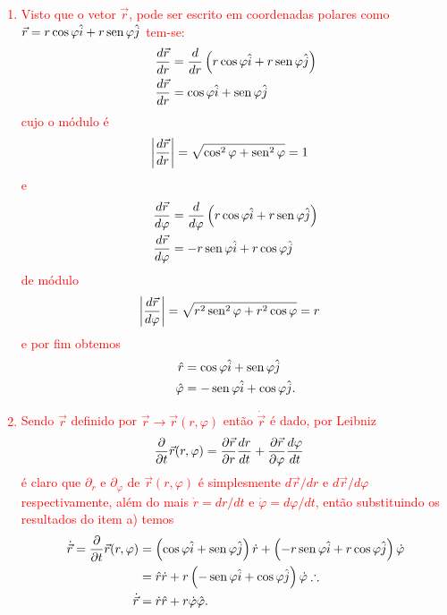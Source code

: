 \textcolor{red}{
	\begin{sol}
		\begin{enumerate}[label=\alph *)]
			\item Visto que o vetor $\vec{r}$, pode ser escrito em coordenadas polares como $\vec{r}=r\cos\varphi\hat{i}+r\operatorname{sen}\varphi \hat{j}$ tem-se:
			\begin{align}
				\frac{d\vec{r}}{dr}&=\frac{d}{dr}\left(r\cos\varphi\hat{i}+r\operatorname{sen}\varphi\hat{j}\right)\nonumber\\ 
				\frac{d\vec{r}}{dr}&=\cos\varphi\hat{i}+\operatorname{sen}\varphi\hat{j}
			\end{align}
	cujo o módulo é \cite{2004}
			\begin{align}
				\left\vert\frac{d\vec{r}}{dr}\right\vert&=\sqrt{\cos^2\varphi+\operatorname{sen}^2\varphi}=1
			\end{align}
	e
			\begin{align}
				\frac{d\vec{r}}{d\varphi}&=\frac{d}{d\varphi}\left(r\cos\varphi\hat{i}+r\operatorname{sen}\varphi\hat{j}\right)\nonumber\\
				\frac{d\vec{r}}{d\varphi}&=-r\operatorname{sen}\varphi\hat{i}+r\cos\varphi\hat{j}
			\end{align}
	de módulo
			\begin{align}
				\left\vert\frac{d\vec{r}}{d\varphi}\right\vert&=\sqrt{r^{2}\operatorname{sen}^2\varphi+r^{2}\cos\varphi}=r
			\end{align}
	e por fim obtemos
			\begin{align}
				\hat{r}&=\cos\varphi\hat{i}+\operatorname{sen}\varphi\hat{j}\\
				\hat{\varphi}&=-\operatorname{sen}\varphi\hat{i}+\cos\varphi\hat{j}.
			\end{align}
			\item Sendo $\vec{r}$ definido por $\vec{r}\rightarrow\vec{r}(r,\varphi)$ então $\dot{\vec{r}}$ é dado, por Leibniz
			\begin{align}
				\frac{\partial {}}{\partial {t}}\vec{r}(r,\varphi)&=\frac{\partial {\vec{r}}}{\partial {r}}\frac{dr}{dt}+\frac{\partial {\vec{r}}}{\partial {\varphi}}\frac{d\varphi}{dt}
			\end{align}
	é claro que $\partial_{r}$ e $\partial_\varphi$ de $\vec{r}(r,\varphi)$ é simplesmente $d\vec{r}/dr$ e $d\vec{r}/d\varphi$ respectivamente, além do mais $\dot{r}=dr/dt$ e $\dot{\varphi}=d\varphi/dt$, então substituindo os resultados do item a) temos
			\begin{align}
				\dot{\vec{r}}=\frac{\partial {}}{\partial {t}}\vec{r}(r,\varphi)&=\left(\cos\varphi\hat{i}+\operatorname{sen}\varphi\hat{j}\right)\dot{r}+\left(-r\operatorname{sen}\varphi\hat{i}+r\cos\varphi\hat{j}\right)\dot{\varphi}\nonumber\\
				&=\hat{r}\dot{r}+r\left(-\operatorname{sen}\varphi\hat{i}+\cos\varphi\hat{j}\right)\dot{\varphi}\therefore\nonumber\\
				\dot{\vec{r}}&=\dot{r}\hat{r}+r\dot{\varphi}\hat{\varphi}.
			\end{align}
		\end{enumerate}
	\end{sol}
}







